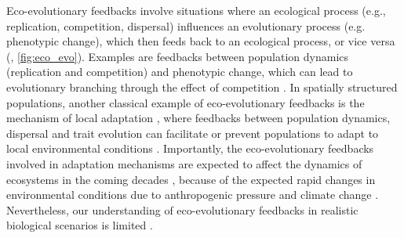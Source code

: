 % 
Eco-evolutionary feedbacks involve situations where an ecological process (e.g., replication, competition, dispersal) influences an evolutionary process (e.g. phenotypic change), which then feeds back to an ecological process, or vice versa (\cite{Govaert2019a}, \cref{fig:eco_evo}). Examples are feedbacks between population dynamics (replication and competition) and phenotypic change, which can lead to evolutionary branching through the effect of competition \citep{Doebeli1999}.
% 
In spatially structured populations, another classical example of eco-evolutionary feedbacks is the mechanism of local adaptation \citep{Savolainen2007}, where feedbacks between population dynamics, dispersal and trait evolution can facilitate or prevent populations to adapt to local environmental conditions \citep{Meszena1997,Doebeli2003}.
% 
Importantly, the eco-evolutionary feedbacks involved in adaptation mechanisms are expected to affect the dynamics of ecosystems in the coming decades \citep{Norberg2012,Urban2016}, because of the expected rapid changes in environmental conditions due to anthropogenic pressure and climate change \citep{Ellis2011,Midgley2019}.
% 
Nevertheless, our understanding of eco-evolutionary feedbacks in realistic biological scenarios is limited \citep{Lion2022}.
% 
% 
% 
% 

